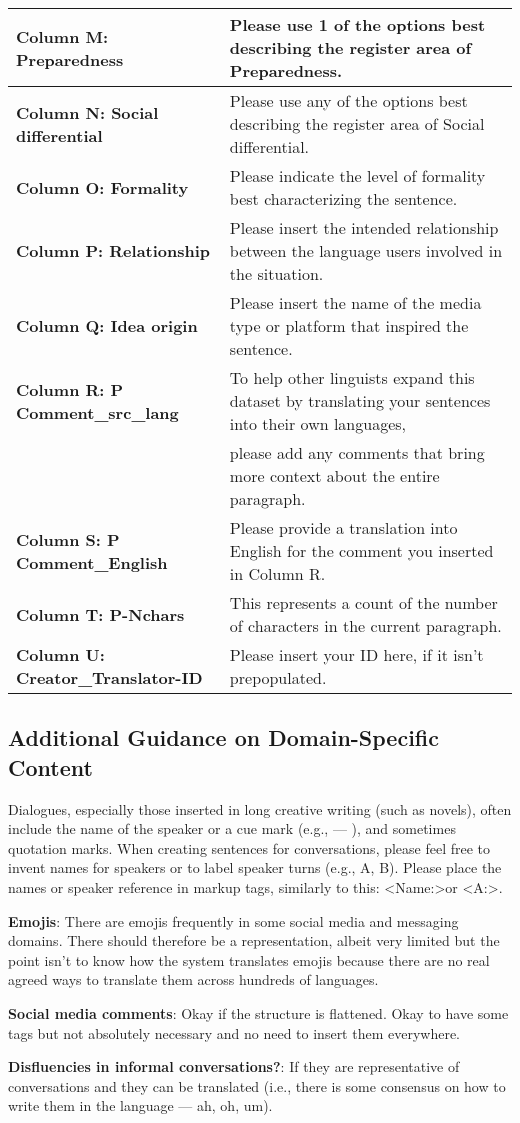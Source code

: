 {\begin{tabular}{|l|l|}
\hline
\textbf{Column M: Preparedness} & Please use 1 of the options best describing the register area of Preparedness. \\
\hline
\textbf{Column N: Social differential} & Please use any of the options best describing the register area of Social differential. \\
\hline
\textbf{Column O: Formality} & Please indicate the level of formality best characterizing the sentence. \\
\hline
\textbf{Column P: Relationship} & Please insert the intended relationship between the language users involved in the situation. \\
\hline
\textbf{Column Q: Idea origin} & Please insert the name of the media type or platform that inspired the sentence. \\
\hline
\textbf{Column R: P Comment\_src\_lang} & To help other linguists expand this dataset by translating your sentences into their own languages, \\& please add any comments that bring more context about the entire paragraph. \\
\hline
\textbf{Column S: P Comment\_English} & Please provide a translation into English for the comment you inserted in Column R. \\
\hline
\textbf{Column T: P-Nchars} & This represents a count of the number of characters in the current paragraph. \\
\hline
\textbf{Column U: Creator\_Translator-ID} & Please insert your ID here, if it isn't prepopulated. \\
\hline
\end{tabular}
}

\subsection{Additional Guidance on Domain-Specific Content}

Dialogues, especially those inserted in long creative writing (such as novels), often include the name of the speaker or a cue mark (e.g., — ), and sometimes quotation marks. When creating sentences for conversations, please feel free to invent names for speakers or to label speaker turns (e.g., A, B). Please place the names or speaker reference in markup tags, similarly to this: \textless Name:\textgreater or \textless A:\textgreater.

\textbf{Emojis}: There are emojis frequently in some social media and messaging domains. There should therefore be a representation, albeit very limited but the point isn't to know how the system translates emojis because there are no real agreed ways to translate them across hundreds of languages.

\textbf{Social media comments}: Okay if the structure is flattened. Okay to have some tags but not absolutely necessary and no need to insert them everywhere.

\textbf{Disfluencies in informal conversations?}: If they are representative of conversations and they can be translated (i.e., there is some consensus on how to write them in the language — ah, oh, um).
